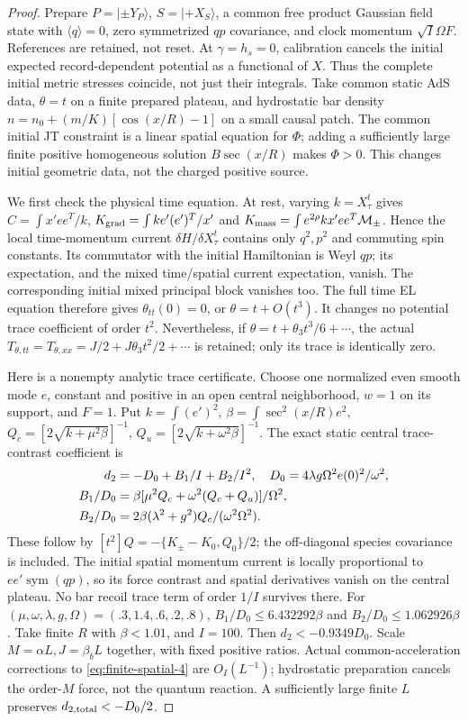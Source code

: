 \begin{proof}
Prepare $P=|\pm Y_P\rangle$, $S=|+X_S\rangle$, a common free product
Gaussian field state with $\langle q\rangle=0$, zero symmetrized $qp$
covariance, and clock momentum $\sqrt I\Omega F$. References are
retained, not reset. At $\gamma=h_s=0$, calibration cancels the initial
expected record-dependent potential as a functional of $X$. Thus the
complete initial metric stresses coincide, not just their integrals.
Take common static AdS data, $\theta=t$ on a finite prepared plateau,
and hydrostatic bar density
$n=n_0+(m/K)[\cos(x/R)-1]$ on a small causal patch. The common initial
JT constraint is a linear spatial equation for $\Phi$; adding a
sufficiently large finite positive homogeneous solution
$B\sec(x/R)$ makes $\Phi>0$. This changes initial geometric data, not
the charged positive source.

We first check the physical time equation. At rest, varying
$k=X_\tau^t$ gives $C=\int x'ee^T/k$,
$K_{\rm grad}=\int ke'(e')^T/x'$ and
$K_{\rm mass}=\int e^{2\rho}kx'ee^T\mathcal M_\pm$.
Hence the local time-momentum current $\delta H/\delta X_\tau^t$
contains only $q^2,p^2$ and commuting spin constants. Its commutator
with the initial Hamiltonian is Weyl $qp$; its expectation, and the
mixed time/spatial current expectation, vanish. The corresponding
initial mixed principal block vanishes too. The full time EL equation
therefore gives $\theta_{tt}(0)=0$, or $\theta=t+O(t^3)$.
It changes no potential trace coefficient of order $t^2$.
Nevertheless, if $\theta=t+\theta_3t^3/6+\cdots$, the actual
$T_{\theta,tt}=T_{\theta,xx}=J/2+J\theta_3t^2/2+\cdots$
is retained; only its trace is identically zero.

Here is a nonempty analytic trace certificate. Choose one normalized
even smooth mode $e$, constant and positive in an open central
neighborhood, $w=1$ on its support, and $F=1$. Put
$k=\int(e')^2$, $\beta=\int\sec^2(x/R)e^2$,
$Q_c=[2\sqrt{k+\mu^2\beta}]^{-1}$,
$Q_u=[2\sqrt{k+\omega^2\beta}]^{-1}$.
The exact static central trace-contrast coefficient is
\begin{align}
 d_2&=-D_0+B_1/I+B_2/I^2,\quad
 D_0=4\lambda g\Omega^2e(0)^2/\omega^2,\notag\\
 B_1/D_0&=\beta[\mu^2Q_c+\omega^2(Q_c+Q_u)]/\Omega^2,
 \\
 B_2/D_0&=2\beta(\lambda^2+g^2)Q_c/(\omega^2\Omega^2).       \label{eq:finite-spatial-4}
\end{align}
These follow by $[t^2]Q=-\{K_\pm-K_0,Q_0\}/2$; the off-diagonal
species covariance is included. The initial spatial momentum current
is locally proportional to $ee'\operatorname{sym}(qp)$, so its force
contrast and spatial derivatives vanish on the central plateau. No
bar recoil trace term of order $1/I$ survives there. For
$(\mu,\omega,\lambda,g,\Omega)=(.3,1.4,.6,.2,.8)$,
$B_1/D_0\le6.432292\beta$ and $B_2/D_0\le1.062926\beta$.
Take finite $R$ with $\beta<1.01$, and $I=100$.
Then $d_2<-0.9349D_0$.
Scale $M=\alpha L,J=\beta_bL$ together, with fixed positive ratios.
Actual common-acceleration corrections to \eqref{eq:finite-spatial-4} are $O_I(L^{-1})$;
hydrostatic preparation cancels the order-$M$ force, not the quantum
reaction. A sufficiently large finite $L$ preserves $d_{2,\rm total}<-D_0/2$.


\end{proof}
